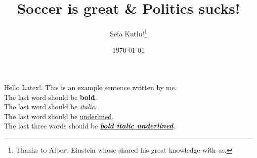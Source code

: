 % 
\title{Soccer is great \& Politics sucks!}   
\author{Sefa Kutlu!\thanks{Thanks to Albert Einstein whose shared his great knowledge with us. }}
\date{\today}                           


    \maketitle
    Hello Latex!. This is an example sentence written by me.
    \\
    The last word should be \textbf{bold}.      
    \\
    The last word should be \textit{italic}.
    \\
    The last word should be \underline{underlined}.
    \\
    The last three words should be \textbf{\textit{\underline{bold italic underlined}}}.


